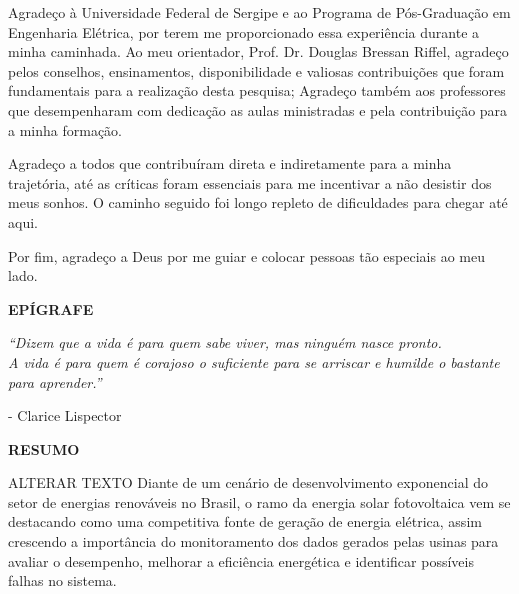 Agradeço à Universidade Federal de Sergipe e ao Programa de Pós-Graduação em Engenharia Elétrica, por terem me proporcionado essa experiência durante a minha caminhada. Ao meu orientador, Prof. Dr. Douglas Bressan Riffel, agradeço pelos conselhos, ensinamentos, disponibilidade e valiosas contribuições que foram fundamentais para a realização desta pesquisa; Agradeço também aos professores que desempenharam com dedicação as aulas ministradas e pela contribuição para a minha formação.

Agradeço a todos que contribuíram direta e indiretamente para a minha trajetória, até as críticas foram essenciais para me incentivar a não desistir dos meus sonhos. O caminho seguido foi longo repleto de dificuldades para chegar até aqui. 

Por fim, agradeço a Deus por me guiar e colocar pessoas tão especiais ao meu lado.



\cleardoublepage
\thispagestyle{empty}

\begin{center}
\textbf{EPÍGRAFE}
\end{center}

\vspace*{\fill}

\noindent
\hspace*{8cm}
\begin{minipage}{\dimexpr\textwidth-8cm\relax}
\textit{“Dizem que a vida é para quem sabe viver,
mas ninguém nasce pronto. \\
A vida é para quem é corajoso o suficiente para se arriscar
e humilde o bastante para aprender.”}

\begin{flushright}
- Clarice Lispector
\end{flushright}
\end{minipage}





\cleardoublepage
\thispagestyle{empty}

\begin{center}
\textbf{RESUMO}
\end{center}

ALTERAR TEXTO
Diante de um cenário de desenvolvimento exponencial do setor de energias renováveis no Brasil, o ramo da energia solar fotovoltaica vem se destacando como uma competitiva fonte de geração de energia elétrica, assim crescendo a importância do monitoramento dos dados gerados pelas usinas para avaliar o desempenho, melhorar a eficiência energética e identificar possíveis falhas no sistema. 

